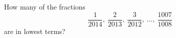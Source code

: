 How many of the fractions
\[
\dfrac{1}{2014},\ \dfrac{2}{2013},\ \dfrac{3}{2012},\ \ldots,\ \dfrac{1007}{1008}
\]
are in lowest terms?
